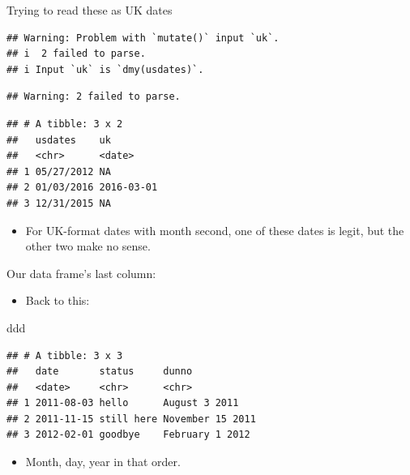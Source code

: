\documentclass[
  ignorenonframetext,
]{beamer}
\newenvironment{Shaded}{\begin{snugshade}}{\end{snugshade}}
\newcommand{\DataTypeTok}[1]{\textcolor[rgb]{0.13,0.29,0.53}{#1}}
\newcommand{\KeywordTok}[1]{\textcolor[rgb]{0.13,0.29,0.53}{\textbf{#1}}}
\newcommand{\NormalTok}[1]{#1}
\newcommand{\OperatorTok}[1]{\textcolor[rgb]{0.81,0.36,0.00}{\textbf{#1}}}
\newcommand{\StringTok}[1]{\textcolor[rgb]{0.31,0.60,0.02}{#1}}
\providecommand{\tightlist}{%
  \setlength{\itemsep}{0pt}\setlength{\parskip}{0pt}}
\begin{document}
\begin{frame}[fragile]{Trying to read these as UK dates}
\protect\hypertarget{trying-to-read-these-as-uk-dates}{}

\begin{Shaded}
\end{Shaded}

\begin{verbatim}
## Warning: Problem with `mutate()` input `uk`.
## i  2 failed to parse.
## i Input `uk` is `dmy(usdates)`.
\end{verbatim}

\begin{verbatim}
## Warning: 2 failed to parse.
\end{verbatim}

\begin{verbatim}
## # A tibble: 3 x 2
##   usdates    uk        
##   <chr>      <date>    
## 1 05/27/2012 NA        
## 2 01/03/2016 2016-03-01
## 3 12/31/2015 NA
\end{verbatim}

\begin{itemize}
\tightlist
\item
  For UK-format dates with month second, one of these dates is legit,
  but the other two make no sense.
\end{itemize}

\end{frame}

\begin{frame}[fragile]{Our data frame's last column:}
\protect\hypertarget{our-data-frames-last-column}{}

\begin{itemize}
\tightlist
\item
  Back to this:
\end{itemize}

\begin{Shaded}
\begin{Highlighting}[]
\NormalTok{ddd}
\end{Highlighting}
\end{Shaded}

\begin{verbatim}
## # A tibble: 3 x 3
##   date       status     dunno           
##   <date>     <chr>      <chr>           
## 1 2011-08-03 hello      August 3 2011   
## 2 2011-11-15 still here November 15 2011
## 3 2012-02-01 goodbye    February 1 2012
\end{verbatim}

\begin{itemize}
\tightlist
\item
  Month, day, year in that order.
\end{itemize}

\end{frame}
\end{document}
